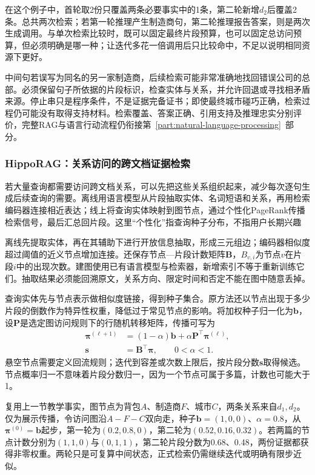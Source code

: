 在这个例子中，首轮取2份只覆盖两条必要事实中的1条，第二轮新增$d_2$后覆盖2条。总共两次检索；若第一轮推理产生制造商句，第二轮推理报告答案，则是两次生成调用。与单次检索比较时，既可以固定最终片段预算，也可以固定总访问预算，但必须明确是哪一种；让迭代多花一倍调用后只比较命中，不足以说明相同资源下更好。

中间句若误写为同名的另一家制造商，后续检索可能非常准确地找回错误公司的总部。必须保留句子所依据的片段标识，检查实体与关系，并允许回退或寻找相矛盾来源。停止串只是程序条件，不是证据完备证书；即使最终城市碰巧正确，检索过程仍可能没有取得支持材料。检索覆盖、答案正确、引用支持及推理忠实分别评价，完整RAG与语言行动流程仍衔接第~\ref{part:natural-language-processing}~部分。

\Needspace{100mm}
\subsubsection{HippoRAG：关系访问的跨文档证据检索}
\label{sec:rs-search-hipporag}

若大量查询都需要访问跨文档关系，可以先把这些关系组织起来，减少每次逐句生成后续查询的需要。离线用语言模型从片段抽取实体、名词短语和关系，再用检索编码器连接相近表达；线上将查询实体映射到图节点，通过个性化PageRank传播检索信号，最后汇总回片段。这里“个性化”指查询种子分布，不指用户长期兴趣

离线先提取实体，再在其辅助下进行开放信息抽取，形成三元组边；编码器相似度超过阈值的近义节点增加连接。还保存节点—片段计数矩阵$\bm B$，$B_{v,i}$为节点$v$在片段$i$中的出现次数。建图使用已有语言模型与检索器，新增索引不等于重新训练它们。抽取结果必须能回溯原文，关系方向、限定时间和否定不能在图中随意丢掉。

查询实体先与节点表示做相似度链接，得到种子集合。原方法还以节点出现于多少片段的倒数作为特异性权重，降低过于常见节点的影响。将加权种子归一化为$\bm b$，设$\bm P$是选定图访问规则下的行随机转移矩阵，传播可写为
\begin{equation}
 \begin{split}
 \bm\pi^{(\ell+1)}&=(1-\alpha)\bm b+
                         \alpha\bm P^\top\bm\pi^{(\ell)},\\
 \bm s&=\bm B^\top\bm\pi,\qquad 0<\alpha<1 .
 \end{split}
 \label{eq:rs-search-hipporag}
\end{equation}
悬空节点需要定义回流规则；迭代到容差或次数上限后，按片段分数$\bm s$取得候选。节点概率归一不意味着片段分数归一，因为一个节点可属于多篇，计数也可能大于1。

复用上一节教学事实，图节点为背包$A$、制造商$F$、城市$C$，两条关系来自$d_1,d_2$。仅为展示传播，令访问图沿$A-F-C$双向走，种子$\bm b=(1,0,0)$、$\alpha=0.8$，从$\bm\pi^{(0)}=\bm b$起步，第一轮为$(0.2,0.8,0)$，第二轮为$(0.52,0.16,0.32)$。若两篇的节点计数分别为$(1,1,0)$与$(0,1,1)$，第二轮片段分数为0.68、0.48，两份证据都获得非零权重。两轮只是可复算中间状态，正式检索仍需继续迭代或明确有限步近似。

